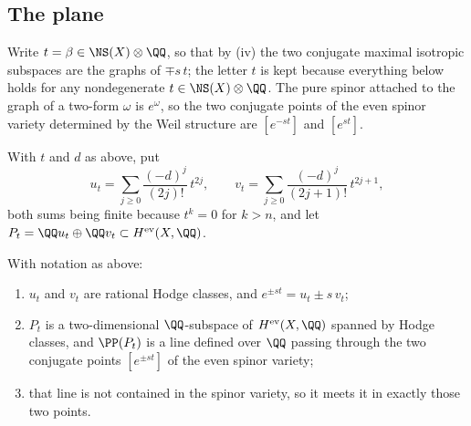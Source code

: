 \subsection{The plane}

Write $t=\beta\in\NS(X)\otimes\QQ$, so that by
(iv) the two conjugate maximal isotropic subspaces are
the graphs of $\mp s\,t$; the letter $t$ is kept because everything below
holds for any nondegenerate $t\in\NS(X)\otimes\QQ$. The pure spinor attached to the graph of a two-form
$\omega$ is $e^{\omega}$, so the two conjugate points of the even spinor
variety determined by the Weil structure are $[e^{-st}]$ and $[e^{st}]$.

\begin{definition}\label{def:secantplane}
With $t$ and $d$ as above, put
\begin{equation}\label{eq:uv}
  u_{t}=\sum_{j\ge0}\frac{(-d)^{j}}{(2j)!}\,t^{2j},
  \qquad
  v_{t}=\sum_{j\ge0}\frac{(-d)^{j}}{(2j+1)!}\,t^{2j+1},
\end{equation}
both sums being finite because $t^{k}=0$ for $k>n$, and let
$P_{t}=\QQ u_{t}\oplus\QQ v_{t}\subset H^{\mathrm{ev}}(X,\QQ)$.
\end{definition}

\begin{theorem}\label{thm:plane}
With notation as above:
\begin{enumerate}[label=\textup{(\roman*)}]
\item $u_{t}$ and $v_{t}$ are rational Hodge classes, and
  $e^{\pm st}=u_{t}\pm s\,v_{t}$;
\item $P_{t}$ is a two-dimensional $\QQ$-subspace of $H^{\mathrm{ev}}(X,\QQ)$
  spanned by Hodge classes, and $\PP(P_{t})$ is a line defined over $\QQ$
  passing through the two conjugate points $[e^{\pm st}]$ of the even spinor
  variety;
\item that line is not contained in the spinor variety, so it meets it in
  exactly those two points.
\end{enumerate}
\end{theorem}

